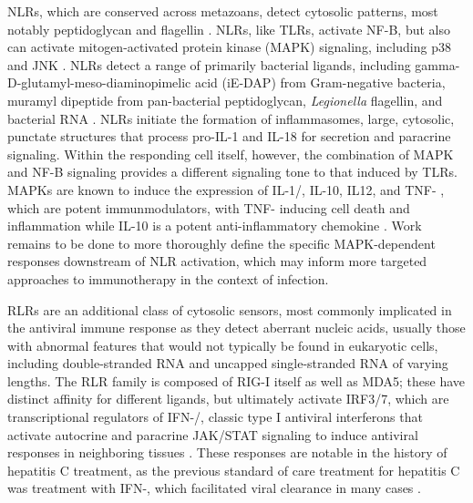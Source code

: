 NLRs, which are conserved across metazoans, detect cytosolic patterns, most notably peptidoglycan and flagellin \citep{Creagh2006, Clarke2014, Motta2015}. NLRs, like TLRs, activate NF-\textkappa B, but also can activate mitogen-activated protein kinase (MAPK) signaling, including p38 and JNK \citep{Shaw2008, Franchi2009, Saxena2014, Platnich2019, Zhong2013, Velloso2019}. NLRs detect a range of primarily bacterial ligands, including gamma-D-glutamyl-meso-diaminopimelic acid (iE-DAP) from Gram-negative bacteria, muramyl dipeptide from pan-bacterial peptidoglycan, \textit{Legionella} flagellin, and bacterial RNA \citep{Saxena2014, Franchi2008}. NLRs initiate the formation of inflammasomes, large, cytosolic, punctate structures that process pro-IL-1\textbeta{} and IL-18 for secretion and paracrine signaling. Within the responding cell itself, however, the combination of MAPK and NF-\textkappa B signaling provides a different signaling tone to that induced by TLRs. MAPKs are known to induce the expression of IL-1\textalpha/\textbeta, IL-10, IL12, and TNF-\textalpha{} \citep{Dong2002, Arthur2013, SoaresSilva2016}, which are potent immunmodulators, with TNF-\textalpha{} inducing cell death and inflammation while IL-10 is a potent anti-inflammatory chemokine \citep{SoaresSilva2016, Couper2008}. Work remains to be done to more thoroughly define the specific MAPK-dependent responses downstream of NLR activation, which may inform more targeted approaches to immunotherapy in the context of infection.

RLRs are an additional class of cytosolic sensors, most commonly implicated in the antiviral immune response as they detect aberrant nucleic acids, usually those with abnormal features that would not typically be found in eukaryotic cells, including double-stranded RNA and uncapped single-stranded RNA of varying lengths. The RLR family is composed of RIG-I itself as well as MDA5; these have distinct affinity for different ligands, but ultimately activate IRF3/7, which are transcriptional regulators of IFN-\textalpha/\textbeta, classic type I antiviral interferons that activate autocrine and paracrine JAK/STAT signaling to induce antiviral responses in neighboring tissues \citep{Loo2011}. These responses are notable in the history of hepatitis C treatment, as the previous standard of care treatment for hepatitis C was treatment with IFN-\textalpha, which facilitated viral clearance in many cases \citep{Rong2010}.

